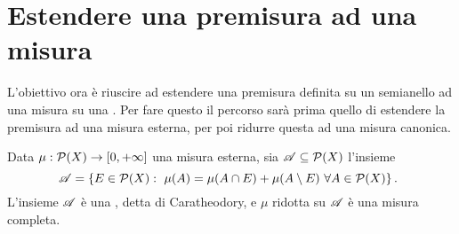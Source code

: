 \section{Estendere una premisura ad una misura}
L'obiettivo ora è riuscire ad estendere una premisura definita su un semianello ad una misura su una \sigalg{}. Per fare questo il percorso sarà prima quello di estendere la premisura ad una misura esterna, per poi ridurre questa ad una misura canonica.


\begin{theorem}\label{thm:RiduzionePreCaratheodory}
	Data $\mu:\mathcal P(X)\to [0,+\infty]$ una misura esterna, sia $\mathscr A\subseteq \mathcal P(X)$ l'insieme
	\begin{equation*}
		\mathscr A=\{E\in\mathcal P(X):\ \mu(A)=\mu(A\cap E)+\mu(A\setminus E)\ \forall A\in \mathcal P(X)\} \, \text{. }
	\end{equation*}
	L'insieme $\mathscr A$ è una \sigalg{}, detta \sigalg{} di Caratheodory, e $\mu$ ridotta su $\mathscr A$ è una misura completa.
\end{theorem}
